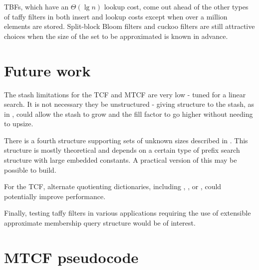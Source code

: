 \documentclass[manuscript,screen,review]{acmart}
\begin{document}
TBFs, which have an $\Theta(\lg n)$ lookup cost, come out ahead of the other types of taffy filters in both insert and lookup costs except when over a million elements are stored.
Split-block Bloom filters and cuckoo filters are still attractive choices when the size of the set to be approximated is known in advance.











\section{Future work}

The stash limitations for the TCF and MTCF are very low - tuned for a linear search.
It is not necessary they be unstructured - giving structure to the stash, as in \cite{backyard}, could allow the stash to grow and the fill factor to go higher without needing to upsize.

There is a fourth structure supporting sets of unknown sizes described in \cite{unknown-prefix}.
This structure is mostly theoretical and depends on a certain type of prefix search structure with large embedded constants.
A practical version of this may be possible to build.

For the TCF, alternate quotienting dictionaries, including \cite{raman-practical}, \cite{broom}, or \cite{quotient-filter}, could potentially improve performance.

Finally, testing taffy filters in various applications requiring the use of extensible approximate membership query structure would be of interest.




\appendix
\section{MTCF pseudocode}
\label{mtcf-appendix}
\end{document}
